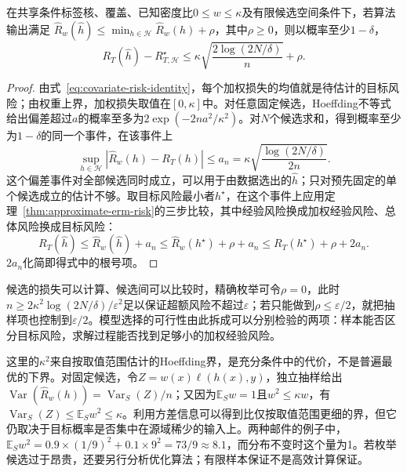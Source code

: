 \begin{theorem}[已知密度比下的迁移样本量界]
\label{thm:covariate-finite-pac}
在共享条件标签核、覆盖、已知密度比$0\leq w\leq\kappa$及有限候选空间条件下，若算法输出满足
$\widehat R_w(\widehat h)\leq\min_{h\in\mathcal H}\widehat R_w(h)+\rho$，其中$\rho\geq0$，则以概率至少$1-\delta$，
\begin{equation}
 R_T(\widehat h)-R_{T,\mathcal H}^{\star}
 \leq\kappa\sqrt{\frac{2\log(2N/\delta)}{n}}+\rho.
 \label{eq:covariate-finite-excess}
\end{equation}
\end{theorem}
\begin{proof}
由式~\eqref{eq:covariate-risk-identity}，每个加权损失的均值就是待估计的目标风险；由权重上界，加权损失取值在$[0,\kappa]$中。对任意固定候选，Hoeffding不等式给出偏差超过$a$的概率至多为$2\exp(-2na^2/\kappa^2)$。对$N$个候选求和，得到概率至少为$1-\delta$的同一个事件，在该事件上
\[
 \sup_{h\in\mathcal H}|\widehat R_w(h)-R_T(h)|
 \leq a_n=\kappa\sqrt{\frac{\log(2N/\delta)}{2n}}.
\]
这个偏差事件对全部候选同时成立，可以用于由数据选出的$\widehat h$；只对预先固定的单个候选成立的估计不够。取目标风险最小者$h^\star$，在这个事件上应用定理~\ref{thm:approximate-erm-risk}的三步比较，其中经验风险换成加权经验风险、总体风险换成目标风险：
\[
 R_T(\widehat h)\leq\widehat R_w(\widehat h)+a_n
 \leq\widehat R_w(h^\star)+\rho+a_n
 \leq R_T(h^\star)+\rho+2a_n .
\]
$2a_n$化简即得式中的根号项。
\end{proof}

候选的损失可以计算、候选间可以比较时，精确枚举可令$\rho=0$，此时$n\geq2\kappa^2\log(2N/\delta)/\varepsilon^2$足以保证超额风险不超过$\varepsilon$；若只能做到$\rho\leq\varepsilon/2$，就把抽样项也控制到$\varepsilon/2$。模型选择的可行性由此拆成可以分别检验的两项：样本能否区分目标风险，求解过程能否找到足够小的加权经验风险。

这里的$\kappa^2$来自按取值范围估计的Hoeffding界，是充分条件中的代价，不是普遍最优的下界。对固定候选，令$Z=w(x)\ell(h(x),y)$，独立抽样给出$\operatorname{Var}(\widehat R_w(h))=\operatorname{Var}_S(Z)/n$；又因为$\mathbb E_Sw=1$且$w^2\leq\kappa w$，有$\operatorname{Var}_S(Z)\leq\mathbb E_Sw^2\leq\kappa$。利用方差信息可以得到比仅按取值范围更细的界，但它仍取决于目标概率是否集中在源域稀少的输入上。两种邮件的例子中，$\mathbb E_Sw^2=0.9\times(1/9)^2+0.1\times9^2=73/9\approx8.1$，而分布不变时这个量为1。若枚举候选过于昂贵，还要另行分析优化算法；有限样本保证不是高效计算保证。
